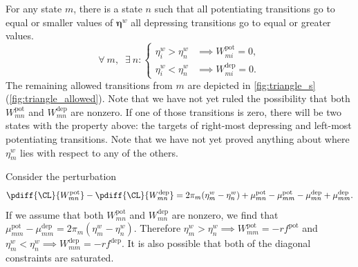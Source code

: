 \documentclass[12pt]{article}
\newcommand{\eqm}{\pi}
\newcommand{\etwm}{\eta^w}
\newcommand{\etw}{\boldsymbol{\eta}^w}
\newcommand{\Wm}{W}
\newcommand{\kktm}{\mu}
\newcommand{\pot}{^{\text{pot}}}
\newcommand{\dep}{^{\text{dep}}}
\begin{document}
For any state \(m\), there is a state \(n\) such that all potentiating transitions go to equal or smaller values of \(\etw\) all depressing transitions go to equal or greater values.
%
\begin{equation}\label{eq:separator}
  \forall\ m, \;\; \exists\ n : 
  \begin{cases}
    \etwm_i > \etwm_n &\implies \Wm\pot_{mi} = 0, \\
    \etwm_i < \etwm_n &\implies \Wm\dep_{mi} = 0.
  \end{cases}
\end{equation}
%
The remaining allowed transitions from \(m\) are depicted in \cref{fig:triangle_s}(\ref{fig:triangle_allowed}).
Note that we have not yet ruled the possibility that both \( \Wm\pot_{mn} \) and \( \Wm\dep_{mn} \) are nonzero.
If one of those transitions is zero, there will be two states with the property above: the targets of right-most depressing and left-most potentiating transitions.
Note that we have not yet proved anything about where \(\etwm_m\) lies with respect to any of the others.

Consider the perturbation
%
\begin{equation}\label{eq:pertK}
  \pdiff{\CL}{\Wm\pot_{mn}} -
  \pdiff{\CL}{\Wm\dep_{mn}} =
    2 \eqm_m (\etwm_m - \etwm_n) 
    + \kktm\pot_{mn} - \kktm\pot_{mm} - \kktm\dep_{mn} + \kktm\dep_{mm}.
\end{equation}
%
If we assume that both \( \Wm\pot_{mn} \) and \( \Wm\dep_{mn} \) are nonzero, we find that \( \kktm\pot_{mm} - \kktm\dep_{mm} = 2 \eqm_m (\etwm_m - \etwm_n) \).
Therefore \( \etwm_m > \etwm_n \implies \Wm\pot_{mm} = -rf\pot \) and \( \etwm_m < \etwm_n \implies \Wm\dep_{mm} = -rf\dep \).
It is also possible that both of the diagonal constraints are saturated.
\end{document}
